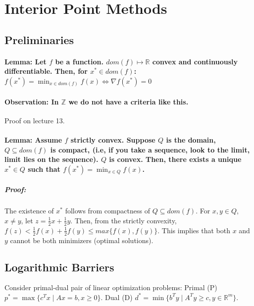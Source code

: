 \documentclass[main]{subfiles}
\begin{document}

\section{Interior Point Methods}

\subsection{Preliminaries}

\paragraph{Lemma: Let $f$ be a function. $dom(f) \mapsto \mathbb{R}$ convex
and continuously differentiable. Then, for $x^* \in dom(f)$:
$f(x^*) = \displaystyle \min_{x \in dom(f)} f(x) \iff \nabla f(x^*) = 0$}

\paragraph{Observation: In $\mathbb{Z}$ we do not have a criteria like this.}
Proof on lecture 13.

\paragraph{Lemma: Assume $f$ strictly convex. Suppose $Q$ is the domain,
$Q \subseteq dom(f)$ is compact, (i.e, if you take a sequence, look to the
limit, limit lies on the sequence). $Q$ is convex. Then, there exists a unique
$x^* \in Q$ such that $f(x^*) = \displaystyle \min_{x \in Q} f(x)$.}

\subparagraph{Proof:}
The existence of $x^*$ follows from compactness of $Q \subseteq dom (f)$. For
$x, y \in Q$, $x \neq y$, let $z = \frac{1}{2}x + \frac{1}{2}y$. Then, from the
strictly convexity, $f(z) < \frac{1}{2} f(x) + \frac{1}{2} f(y) \leq max \{f(x),
f(y) \}$. This implies that both $x$ and $y$ cannot be both minimizers (optimal
solutions).

\subsection{Logarithmic Barriers}
Consider primal-dual pair of linear optimization problems:
Primal (P) $p^* = \max \{c^T x \mid Ax = b, x \geq 0 \}$.
Dual (D) $d^* = \min \{b^T y \mid A^T y \geq c, y \in \mathbb{R}^m \}$.
\end{document}
